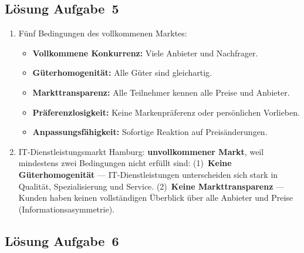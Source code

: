 \documentclass[11pt, a4paper]{article}
\begin{document}
\subsection*{Lösung Aufgabe~5}

\begin{enumerate}[label=(\alph*)]
  \item Fünf Bedingungen des vollkommenen Marktes:
  \begin{itemize}
    \item \textbf{Vollkommene Konkurrenz:} Viele Anbieter und Nachfrager.
    \item \textbf{Güterhomogenität:} Alle Güter sind gleichartig.
    \item \textbf{Markttransparenz:} Alle Teilnehmer kennen alle Preise und Anbieter.
    \item \textbf{Präferenzlosigkeit:} Keine Markenpräferenz oder persönlichen Vorlieben.
    \item \textbf{Anpassungsfähigkeit:} Sofortige Reaktion auf Preisänderungen.
  \end{itemize}

  \item IT-Dienstleistungsmarkt Hamburg: \textbf{unvollkommener Markt}, weil mindestens
  zwei Bedingungen nicht erfüllt sind: (1)~\textbf{Keine Güterhomogenität} --- IT-Dienstleistungen
  unterscheiden sich stark in Qualität, Spezialisierung und Service. (2)~\textbf{Keine
  Markttransparenz} --- Kunden haben keinen vollständigen Überblick über alle Anbieter
  und Preise (Informationsasymmetrie).
\end{enumerate}

\subsection*{Lösung Aufgabe~6}
\end{document}
